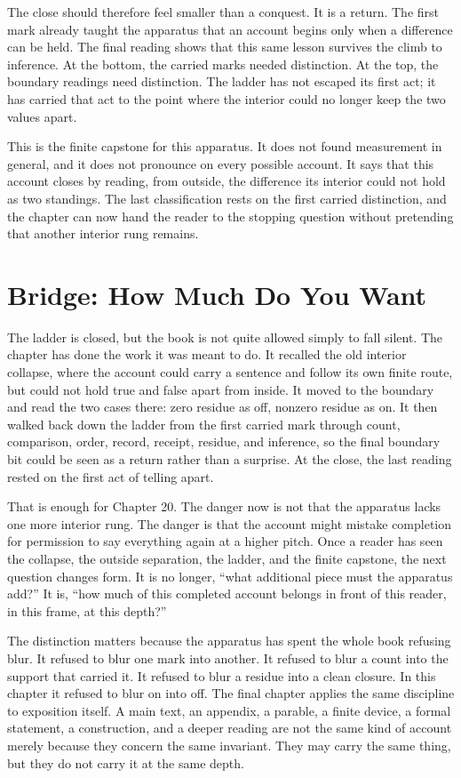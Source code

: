 The close should therefore feel smaller than a conquest. It is a return. The
first mark already taught the apparatus that an account begins only when a
difference can be held. The final reading shows that this same lesson survives
the climb to inference. At the bottom, the carried marks needed distinction.
At the top, the boundary readings need distinction. The ladder has not escaped
its first act; it has carried that act to the point where the interior could no
longer keep the two values apart.

This is the finite capstone for this apparatus. It does not found measurement
in general, and it does not pronounce on every possible account. It says that
this account closes by reading, from outside, the difference its interior
could not hold as two standings. The last classification rests on the first
carried distinction, and the chapter can now hand the reader to the stopping
question without pretending that another interior rung remains.

\section*{Bridge: How Much Do You Want}

The ladder is closed, but the book is not quite allowed simply to fall silent. The chapter has
done the work it was meant to do. It recalled the old interior collapse, where the account could
carry a sentence and follow its own finite route, but could not hold true and false apart from
inside. It moved to the boundary and read the two cases there: zero residue as off, nonzero
residue as on. It then walked back down the ladder from the first carried mark through count,
comparison, order, record, receipt, residue, and inference, so the final boundary bit could be
seen as a return rather than a surprise. At the close, the last reading rested on the first act
of telling apart.

That is enough for Chapter 20. The danger now is not that the apparatus lacks one more interior
rung. The danger is that the account might mistake completion for permission to say everything
again at a higher pitch. Once a reader has seen the collapse, the outside separation, the ladder,
and the finite capstone, the next question changes form. It is no longer, ``what additional
piece must the apparatus add?'' It is, ``how much of this completed account belongs in front of
this reader, in this frame, at this depth?''

The distinction matters because the apparatus has spent the whole book refusing blur. It refused
to blur one mark into another. It refused to blur a count into the support that carried it. It
refused to blur a residue into a clean closure. In this chapter it refused to blur on into off.
The final chapter applies the same discipline to exposition itself. A main text, an appendix, a
parable, a finite device, a formal statement, a construction, and a deeper reading are not the
same kind of account merely because they concern the same invariant. They may carry the same
thing, but they do not carry it at the same depth.

